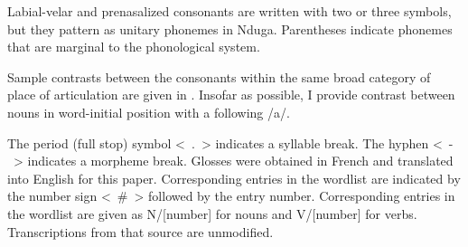 \documentclass[output=paper,colorlinks,citecolor=brown
]{langscibook}
\begin{document}
\begin{table}
\caption{Consonant phonemes in Nduga}
\label{tab:olson:consonants}
\end{table}

Labial-velar and prenasalized consonants are written with two or three symbols, but they pattern as unitary phonemes in Nduga. Parentheses indicate phonemes that are marginal to the phonological system.

Sample contrasts between the consonants within the same broad category of place of articulation are given in . Insofar as possible, I provide contrast between nouns in word-initial position with a following /a/.

The period (full stop) symbol \mbox{< . >} indicates a syllable break. The hyphen \mbox{< - >} indicates a morpheme break. Glosses were obtained in French and translated into English for this paper. Corresponding entries in the wordlist are indicated by the number sign \mbox{< \# >} followed by the entry number. Corresponding entries in the \citet{boyeldieuetal2006} wordlist are given as N/[number] for nouns and V/[number] for verbs. Transcriptions from that source are unmodified.
\end{document}
